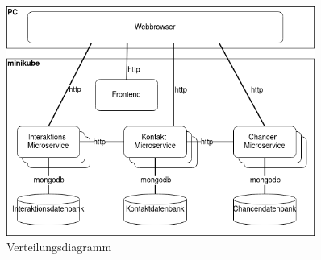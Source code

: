 \begin{figure}[H] 
    \centering
    \includegraphics[width=0.9\textwidth]{figures/DeploymentDiagramm.png}
    \caption{Verteilungsdiagramm}
\end{figure}
